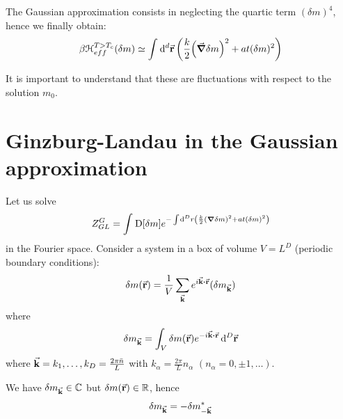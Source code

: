 \documentclass[../main/main.tex]{subfiles}
\begin{document}
The Gaussian approximation consists in neglecting the quartic term \( (\delta m)^4 \), hence we finally obtain:
\begin{equation}
    \beta \mathcal{H}_{eff}^{T>T_c} (\delta m) \simeq  \int_{}^{} \dd[d]{\va{r}} \qty(\frac{k}{2} \qty( \va{\grad } \delta m)^2 + a t (\delta m)^2 )
\end{equation}
\begin{remark}
It is important to understand that these are fluctuations with respect to the solution \( m_0 \).
\end{remark}








\section{Ginzburg-Landau in the Gaussian approximation}

Let us solve
\begin{equation}
  Z_{GL}^G = \int_{}^{} \text{D} \qty[\delta m] e^{- \int_{}^{} \dd[D]{r} \qty(\frac{k}{2} \qty(\grad \delta m)^2 + a t (\delta m)^2  )  }
 \end{equation}
 in the Fourier space.  Consider a system in a box of volume \( V = L^D \) (periodic boundary conditions):
 \begin{equation}
   \delta m (\va{r}) = \frac{1}{V} \sum_{\va{k}}  e^{i \va{k}\vdot \va{r}} (\delta m_{\va{k}})
 \end{equation}
where
\begin{equation}
  \delta m_{\va{k}} = \int_{V}^{}  \delta m (\va{r}) e^{-i \va{k} \vdot \va{r} }\dd[D]{\va{r}}
\end{equation}
where \( \va{k} = k_1, \dots, k_D = \frac{2 \pi  \bar{n} }{L}\) with \( k_ \alpha = \frac{2 \pi }{L} n_ \alpha  \) \( (n_ \alpha  = 0 , \pm 1, \dots) \).
\begin{remark}
  We have \( \delta m_{\va{k}} \in \mathbb{C} \) but \( \delta m (\va{r}) \in \mathbb{R} \), hence
  \begin{equation}
    \delta m_{\va{k}} = - \delta m^*_{-\va{k}}
  \end{equation}
\end{remark}
\end{document}

